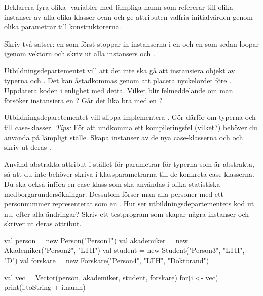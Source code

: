 \Subtask Deklarera fyra olika -variabler med lämpliga namn som refererar till olika instanser av alla olika klasser ovan och ge attributen valfria initialvärden genom olika parametrar till konstruktorerna.

\Subtask Skriv två satser: en som först stoppar in instanserna i en  och en som sedan loopar igenom vektorn och skriv ut alla instansers  och .

\Subtask Utbildningsdepartementet vill att det inte ska gå att instansiera objekt av typerna  och . Det kan åstadkommas genom att placera nyckelordet  före . Uppdatera koden i enlighet med detta. Vilket blir felmeddelande om man försöker instansiera en ? Går det lika bra med en ?

\Subtask Utbildningsdeparetementet vill slippa implementera . Gör därför om typerna  och  till case-klasser. \emph{Tips:} För att undkomma ett kompileringsfel (vilket?) behöver du använda  på lämpligt ställe.
Skapa instanser av de nya case-klasserna  och  och skriv ut deras . 

\Subtask 
Använd abstrakta attribut i stället för parametrar för typerna som är abstrakta, så att du inte behöver skriva  i klassparametrarna till de konkreta case-klasserna.
Du ska också införa en case-klass  som ska användas i olika statistiska medborgarundersökningar.
Dessutom förser man alla personer med ett personnummer representerat som en .
Hur ser utbildningsdepartementets kod ut nu, efter alla ändringar? Skriv ett testprogram som skapar några instanser och skriver ut deras attribut.

\SOLUTION


\TaskSolved \what


\SubtaskSolved
\begin{Code}
val person = new Person("Person1")
val akademiker = new Akademiker("Person2", "LTH")
val student = new Student("Person3", "LTH", "D")
val forskare = new Forskare("Person4", "LTH", "Doktorand")
\end{Code}

\SubtaskSolved
\begin{Code}
val vec = Vector(person, akademiker, student, forskare)
for(i <- vec){ print(i.toString + i.namn) }
\end{Code}


